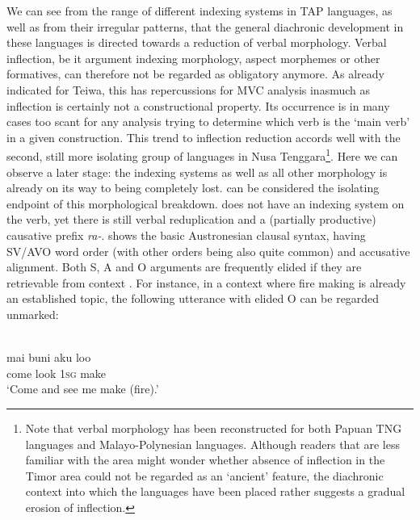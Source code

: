 We can see from the range of different indexing systems in TAP languages, as well as from their irregular patterns, that the general diachronic development in these languages is directed towards a reduction of verbal morphology. Verbal inflection, be it argument indexing morphology, aspect morphemes or other formatives, can therefore not be regarded as obligatory anymore. As already indicated for Teiwa, this has repercussions for MVC analysis inasmuch as inflection is certainly not a constructional property. Its occurrence is in many cases too scant for any analysis trying to determine which verb is the `main verb' in a given construction. This trend to inflection reduction accords well with the second, still more isolating group of languages in Nusa Tenggara\footnote{Note that verbal morphology has been reconstructed for both Papuan TNG languages and Malayo-Polynesian languages. Although readers that are less familiar with the area might wonder whether absence of inflection in the Timor area could not be regarded as an `ancient' feature, the diachronic context into which the languages have been placed rather suggests a gradual erosion of inflection.}. Here we can observe a later stage: the indexing systems as well as all other morphology is already on its way to being completely lost.  can be considered the isolating endpoint of this morphological breakdown.  does not have an indexing system on the verb, yet there is still verbal reduplication and a (partially productive) causative prefix \textit{ra-}.  shows the basic Austronesian clausal syntax, having SV/AVO word order (with other orders being also quite common) and accusative alignment. Both S, A and O arguments are frequently elided if they are retrievable from context \citep{bowden2006}. For instance, in a context where fire making is already an established topic, the following utterance with elided O can be regarded unmarked:

\ea 
{}\\
\gll mai buni aku loo \\
come look \textsc{1}\textsc{sg} make \\
\glft ‘Come and see me make (fire).’
\z

